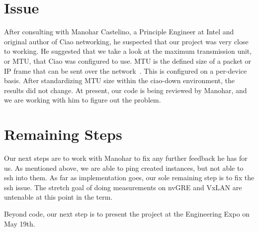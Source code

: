 \documentclass[10pt,onecolumn,journal,draftclsnofoot]{IEEEtran}
\begin{document}
\section{Issue}
After consulting with Manohar Castelino, a Principle Engineer at Intel and
original author of Ciao networking, he suspected that our project was very close
to working.  He suggested that we take a look at the maximum transmission unit,
or MTU, that Ciao was configured to use. MTU is the defined size of a packet or
IP frame that can be sent over the network~\cite{MTU}. This is configured on a
per-device basis. After standardizing MTU size within the ciao-down environment,
the results did not change. At present, our code is being reviewed by Manohar,
and we are working with him to figure out the problem.


\section{Remaining Steps}

Our next steps are to work with Manohar to fix any further feedback he has for
us. As mentioned above, we are able to ping created instances, but not able to
ssh into them. As far as implementation goes, our sole remaining step is to fix
the ssh issue. The stretch goal of doing measurements on nvGRE and VxLAN are
untenable at this point in the term.

Beyond code, our next step is to present the project at the Engineering Expo on
May 19th.



\end{document}
